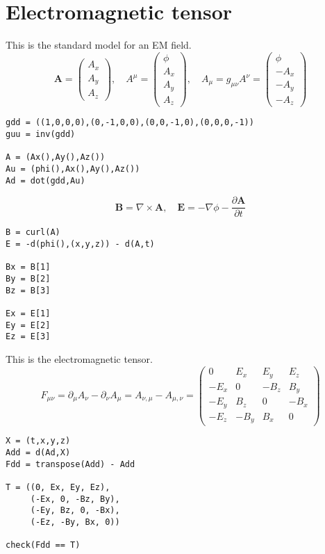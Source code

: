 

\section*{Electromagnetic tensor}

This is the standard model for an EM field.
\begin{equation*}
\mathbf A=\begin{pmatrix}A_x\\A_y\\A_z\end{pmatrix},\quad
A^\mu=\begin{pmatrix}\phi\\A_x\\A_y\\A_z\end{pmatrix},\quad
A_\mu=g_{\mu\nu}A^\nu=\begin{pmatrix}\phi\\-A_x\\-A_y\\-A_z\end{pmatrix}
\end{equation*}
{\footnotesize
\begin{verbatim}
gdd = ((1,0,0,0),(0,-1,0,0),(0,0,-1,0),(0,0,0,-1))
guu = inv(gdd)

A = (Ax(),Ay(),Az())
Au = (phi(),Ax(),Ay(),Az())
Ad = dot(gdd,Au)
\end{verbatim}}

\begin{equation*}
\mathbf B=\nabla\times\mathbf A,\quad
\mathbf E=-\nabla\phi-\frac{\partial\mathbf A}{\partial t}
\end{equation*}
{\footnotesize
\begin{verbatim}
B = curl(A)
E = -d(phi(),(x,y,z)) - d(A,t)

Bx = B[1]
By = B[2]
Bz = B[3]

Ex = E[1]
Ey = E[2]
Ez = E[3]
\end{verbatim}}

This is the electromagnetic tensor.
\begin{equation*}
F_{\mu\nu}
=\partial_\mu A_\nu-\partial_\nu A_\mu
=A_{\nu,\mu}-A_{\mu,\nu}
=\begin{pmatrix}
0 & E_x & E_y & E_z
\\
-E_x & 0 & -B_z & B_y
\\
-E_y & B_z & 0 & -B_x
\\
-E_z & -B_y & B_x & 0
\end{pmatrix}
\end{equation*}
{\footnotesize
\begin{verbatim}
X = (t,x,y,z)
Add = d(Ad,X)
Fdd = transpose(Add) - Add

T = ((0, Ex, Ey, Ez),
     (-Ex, 0, -Bz, By),
     (-Ey, Bz, 0, -Bx),
     (-Ez, -By, Bx, 0))

check(Fdd == T)
\end{verbatim}}

